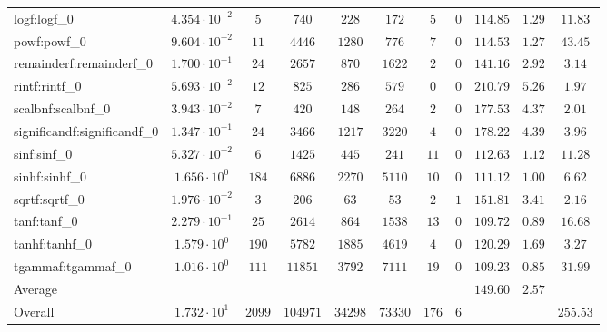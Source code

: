 \begin{tabular}{|l|c|c|c|c|c|c|c|c|c|c|}
logf:logf\_0                 & $ 4.354 \cdot 10^{-2} $ & $ 5      $ & $ 740    $ & $ 228   $ & $ 172   $ & $ 5   $ & $ 0 $ & $ 114.85      $ & $ 1.29    $ & $ 11.83   $ \\
powf:powf\_0                 & $ 9.604 \cdot 10^{-2} $ & $ 11     $ & $ 4446   $ & $ 1280  $ & $ 776   $ & $ 7   $ & $ 0 $ & $ 114.53      $ & $ 1.27    $ & $ 43.45   $ \\
remainderf:remainderf\_0     & $ 1.700 \cdot 10^{-1} $ & $ 24     $ & $ 2657   $ & $ 870   $ & $ 1622  $ & $ 2   $ & $ 0 $ & $ 141.16      $ & $ 2.92    $ & $ 3.14    $ \\
rintf:rintf\_0               & $ 5.693 \cdot 10^{-2} $ & $ 12     $ & $ 825    $ & $ 286   $ & $ 579   $ & $ 0   $ & $ 0 $ & $ 210.79      $ & $ 5.26    $ & $ 1.97    $ \\
scalbnf:scalbnf\_0           & $ 3.943 \cdot 10^{-2} $ & $ 7      $ & $ 420    $ & $ 148   $ & $ 264   $ & $ 2   $ & $ 0 $ & $ 177.53      $ & $ 4.37    $ & $ 2.01    $ \\
significandf:significandf\_0 & $ 1.347 \cdot 10^{-1} $ & $ 24     $ & $ 3466   $ & $ 1217  $ & $ 3220  $ & $ 4   $ & $ 0 $ & $ 178.22      $ & $ 4.39    $ & $ 3.96    $ \\
sinf:sinf\_0                 & $ 5.327 \cdot 10^{-2} $ & $ 6      $ & $ 1425   $ & $ 445   $ & $ 241   $ & $ 11  $ & $ 0 $ & $ 112.63      $ & $ 1.12    $ & $ 11.28   $ \\
sinhf:sinhf\_0               & $ 1.656 \cdot 10^{0}  $ & $ 184    $ & $ 6886   $ & $ 2270  $ & $ 5110  $ & $ 10  $ & $ 0 $ & $ 111.12      $ & $ 1.00    $ & $ 6.62    $ \\
sqrtf:sqrtf\_0               & $ 1.976 \cdot 10^{-2} $ & $ 3      $ & $ 206    $ & $ 63    $ & $ 53    $ & $ 2   $ & $ 1 $ & $ 151.81      $ & $ 3.41    $ & $ 2.16    $ \\
tanf:tanf\_0                 & $ 2.279 \cdot 10^{-1} $ & $ 25     $ & $ 2614   $ & $ 864   $ & $ 1538  $ & $ 13  $ & $ 0 $ & $ 109.72      $ & $ 0.89    $ & $ 16.68   $ \\
tanhf:tanhf\_0               & $ 1.579 \cdot 10^{0}  $ & $ 190    $ & $ 5782   $ & $ 1885  $ & $ 4619  $ & $ 4   $ & $ 0 $ & $ 120.29      $ & $ 1.69    $ & $ 3.27    $ \\
tgammaf:tgammaf\_0           & $ 1.016 \cdot 10^{0}  $ & $ 111    $ & $ 11851  $ & $ 3792  $ & $ 7111  $ & $ 19  $ & $ 0 $ & $ 109.23      $ & $ 0.85    $ & $ 31.99   $ \\
\hline
Average                      & $                     $ & $        $ & $        $ & $       $ & $       $ & $     $ & $   $ & $ 149.60      $ & $ 2.57    $ & $         $ \\
\hline
Overall                      & $ 1.732 \cdot 10^{1}  $ & $ 2099   $ & $ 104971 $ & $ 34298 $ & $ 73330 $ & $ 176 $ & $ 6 $ & $             $ & $         $ & $ 255.53  $ \\
\hline
\end{tabular}
